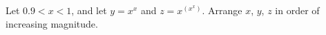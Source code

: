 Let $0.9<x<1$, and let $y=x^x$ and $z=x^{\left(x^x\right)}$. Arrange $x$, $y$, $z$ in order of increasing magnitude.
